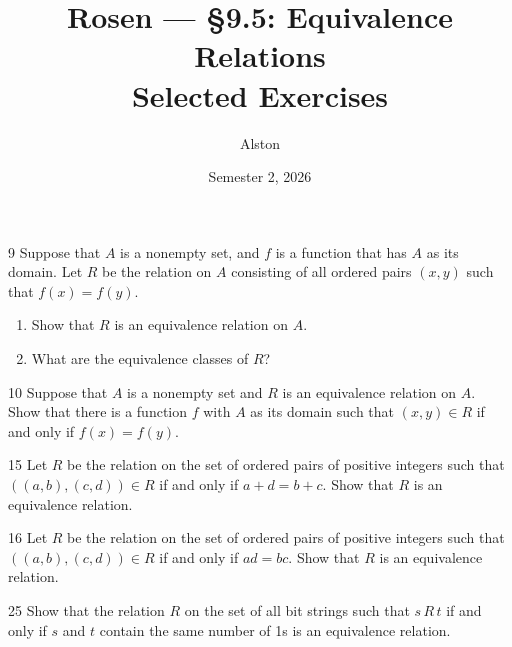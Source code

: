\documentclass[11pt]{article}
\title{Rosen --- \S 9.5: Equivalence Relations\\ \large Selected Exercises}
\author{Alston}
\date{Semester 2, 2026}
\begin{document}
\maketitle

\begin{exercise}{9}
    Suppose that $A$ is a nonempty set, and $f$ is a function that has
    $A$ as its domain. Let $R$ be the relation on $A$ consisting of
    all ordered pairs $(x,y)$ such that $f(x) = f(y)$.
    \begin{enumerate}[label=(\alph*)]
        \item Show that $R$ is an equivalence relation on $A$.
        \item What are the equivalence classes of $R$?
    \end{enumerate}
\end{exercise}

\begin{exercise}{10}
    Suppose that $A$ is a nonempty set and $R$ is an equivalence
    relation on $A$. Show that there is a function $f$ with $A$ as its
    domain such that $(x,y) \in R$ if and only if $f(x) = f(y)$.
\end{exercise}

\begin{exercise}{15}
    Let $R$ be the relation on the set of ordered pairs of positive
    integers such that $((a,b),(c,d)) \in R$ if and only if
    $a + d = b + c$. Show that $R$ is an equivalence relation.
\end{exercise}

\begin{exercise}{16}
    Let $R$ be the relation on the set of ordered pairs of positive
    integers such that $((a,b),(c,d)) \in R$ if and only if
    $ad = bc$. Show that $R$ is an equivalence relation.
\end{exercise}

\begin{exercise}{25}
    Show that the relation $R$ on the set of all bit strings such that
    $s\,R\,t$ if and only if $s$ and $t$ contain the same number of
    1s is an equivalence relation.
\end{exercise}
\end{document}
